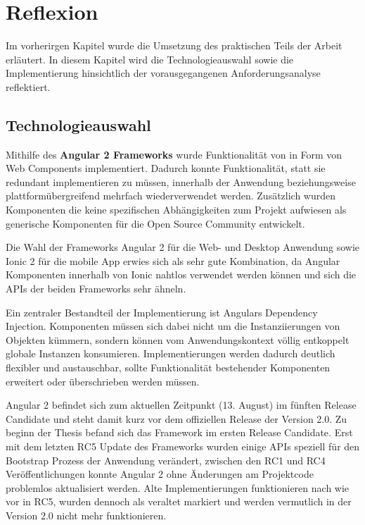 
\chapter{Reflexion}

Im vorherirgen Kapitel wurde die Umsetzung des praktischen Teils der Arbeit erläutert.
In diesem Kapitel wird die Technologieauswahl sowie die Implementierung
hinsichtlich der vorausgegangenen Anforderungsanalyse reflektiert.

\label{chap:reflexion}

\section{Technologieauswahl}

Mithilfe des \textbf{Angular 2 Frameworks} wurde Funktionalität von \projectname{} in Form von
Web Components implementiert.
Dadurch konnte Funktionalität, statt sie redundant implementieren zu müssen, innerhalb der
Anwendung beziehungsweise plattformübergreifend mehrfach wiederverwendet werden.
Zusätzlich wurden Komponenten die keine spezifischen Abhängigkeiten zum Projekt aufwiesen als
generische Komponenten für die Open Source Community entwickelt.

Die Wahl der Frameworks Angular 2 für die Web- und Desktop Anwendung sowie Ionic 2 für
die mobile App erwies sich als sehr gute Kombination,
da Angular Komponenten innerhalb von Ionic nahtlos verwendet werden können
und sich die APIs der beiden Frameworks sehr ähneln.

Ein zentraler Bestandteil der Implementierung ist Angulars Dependency Injection.
Komponenten müssen sich dabei nicht um die Instanziierungen von Objekten kümmern,
sondern können vom Anwendungskontext völlig entkoppelt globale Instanzen konsumieren.
Implementierungen werden dadurch deutlich flexibler und austauschbar,
sollte Funktionalität bestehender Komponenten erweitert oder überschrieben werden müssen.

Angular 2 befindet sich zum aktuellen Zeitpunkt (13. August) im fünften Release Candidate und steht damit kurz
vor dem offiziellen Release der Version 2.0. Zu beginn der Thesis befand sich das Framework im ersten Release Candidate.
Erst mit dem letzten RC5 Update des Frameworks wurden einige APIs speziell für den Bootstrap Prozess der Anwendung verändert,
zwischen den RC1 und RC4 Veröffentlichungen konnte Angular 2 ohne Änderungen am Projektcode problemlos
aktualisiert werden. Alte Implementierungen funktionieren nach wie vor in RC5,
wurden dennoch als veraltet markiert und werden vermutlich in der Version 2.0 nicht mehr
funktionieren.



